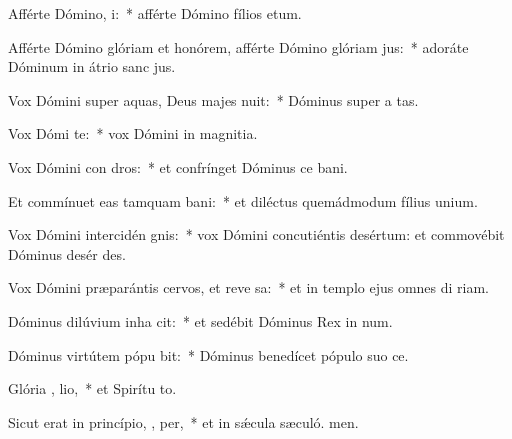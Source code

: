 \item Afférte Dómino,  i:~* afférte Dómino fílios etum.
\item Afférte Dómino glóriam et honórem, afférte Dómino glóriam  jus:~* adoráte Dóminum in átrio sanc jus.
\item Vox Dómini super aquas, Deus majes nuit:~* Dóminus super a tas.
\item Vox Dómi  te:~* vox Dómini in magnitia.
\item Vox Dómini con dros:~* et confrínget Dóminus ce bani.
\item Et commínuet eas tamquam  bani:~* et diléctus quemádmodum fílius unium.
\item Vox Dómini intercidén  gnis:~* vox Dómini concutiéntis desértum: et commovébit Dóminus desér des.
\item Vox Dómini præparántis cervos, et reve sa:~* et in templo ejus omnes di riam.
\item Dóminus dilúvium inha cit:~* et sedébit Dóminus Rex in num.
\item Dóminus virtútem pópu  bit:~* Dóminus benedícet pópulo suo  ce.
\item Glória ,  lio,~* et Spirítu to.
\item Sicut erat in princípio,  ,  per,~* et in sǽcula sæculó. men.

